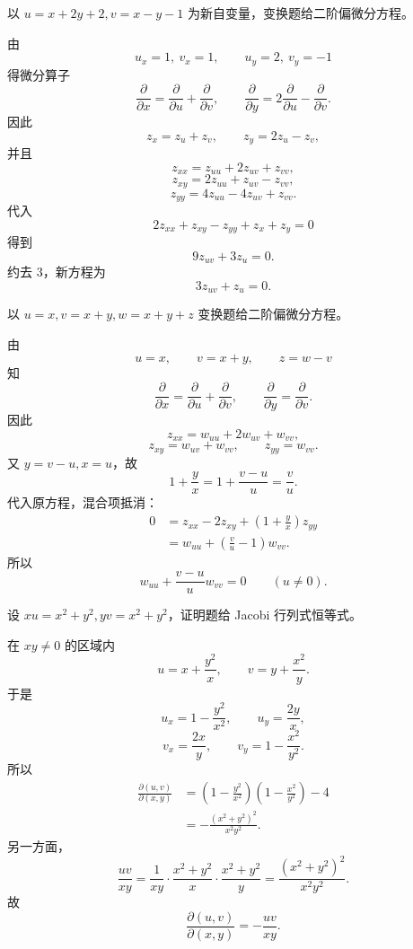 \begin{xexercise}[20.3.3 练习题 8]
以 $u=x+2y+2,v=x-y-1$ 为新自变量，变换题给二阶偏微分方程。
\end{xexercise}
\begin{xsolution}
由
\[
  u_x=1,\ v_x=1,
  \qquad
  u_y=2,\ v_y=-1
\]
得微分算子
\[
  \frac\partial{\partial x}=\frac\partial{\partial u}+\frac\partial{\partial v},
  \qquad
  \frac\partial{\partial y}=2\frac\partial{\partial u}-\frac\partial{\partial v}.
\]
因此
\[
  z_x=z_u+z_v,
  \qquad z_y=2z_u-z_v,
\]
并且
\[
  z_{xx}=z_{uu}+2z_{uv}+z_{vv},
\]
\[
  z_{xy}=2z_{uu}+z_{uv}-z_{vv},
\]
\[
  z_{yy}=4z_{uu}-4z_{uv}+z_{vv}.
\]
代入
\[
  2z_{xx}+z_{xy}-z_{yy}+z_x+z_y=0
\]
得到
\[
  9z_{uv}+3z_u=0.
\]
约去 $3$，新方程为
\[
  \boxed{\displaystyle 3z_{uv}+z_u=0}.
\]
\end{xsolution}

\begin{xexercise}[20.3.3 练习题 9]
以 $u=x,v=x+y,w=x+y+z$ 变换题给二阶偏微分方程。
\end{xexercise}
\begin{xsolution}
由
\[
  u=x,\qquad v=x+y,\qquad z=w-v
\]
知
\[
  \frac\partial{\partial x}=\frac\partial{\partial u}+\frac\partial{\partial v},
  \qquad
  \frac\partial{\partial y}=\frac\partial{\partial v}.
\]
因此
\[
  z_{xx}=w_{uu}+2w_{uv}+w_{vv},
\]
\[
  z_{xy}=w_{uv}+w_{vv},
  \qquad
  z_{yy}=w_{vv}.
\]
又 $y=v-u,x=u$，故
\[
  1+\frac yx=1+\frac{v-u}{u}=\frac vu.
\]
代入原方程，混合项抵消：
\begin{align*}
  0&=z_{xx}-2z_{xy}+\left(1+\frac yx\right)z_{yy}\\
   &=w_{uu}+\left(\frac vu-1\right)w_{vv}.
\end{align*}
所以
\[
  \boxed{\displaystyle
    w_{uu}+\frac{v-u}{u}w_{vv}=0}
  \qquad(u\ne0).
\]
\end{xsolution}

\begin{xexercise}[20.3.3 练习题 10]
设 $xu=x^2+y^2,yv=x^2+y^2$，证明题给 Jacobi 行列式恒等式。
\end{xexercise}
\begin{xsolution}
在 $xy\ne0$ 的区域内
\[
  u=x+\frac{y^2}{x},
  \qquad
  v=y+\frac{x^2}{y}.
\]
于是
\[
  u_x=1-\frac{y^2}{x^2},
  \qquad u_y=\frac{2y}{x},
\]
\[
  v_x=\frac{2x}{y},
  \qquad v_y=1-\frac{x^2}{y^2}.
\]
所以
\begin{align*}
  \frac{\partial(u,v)}{\partial(x,y)}
  &=\left(1-\frac{y^2}{x^2}\right)
    \left(1-\frac{x^2}{y^2}\right)-4\\
  &=-\frac{(x^2+y^2)^2}{x^2y^2}.
\end{align*}
另一方面，
\[
  \frac{uv}{xy}
  =\frac1{xy}\cdot\frac{x^2+y^2}{x}
                  \cdot\frac{x^2+y^2}{y}
  =\frac{(x^2+y^2)^2}{x^2y^2}.
\]
故
\[
  \boxed{\displaystyle
    \frac{\partial(u,v)}{\partial(x,y)}=-\frac{uv}{xy}}.
\]
\end{xsolution}

